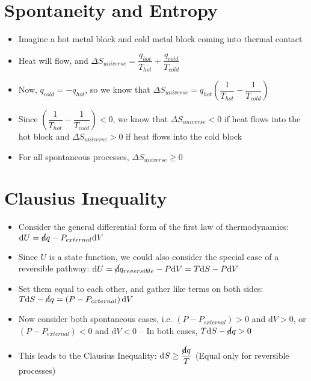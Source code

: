 \documentclass[12pt, openany, letterpaper]{memoir}
\begin{document}
\section*{Spontaneity and Entropy}
\begin{itemize}
	\item Imagine a hot metal block and cold metal block coming into thermal contact
	\item Heat will flow, and $\Delta S_{universe} = \dfrac{q_{hot}}{T_{hot}}  + \dfrac{q_{cold}}{T_{cold}}$
	\item Now, $q_{cold}=-q_{hot}$, so we know that $\Delta S_{universe} = q_{hot}\left(\dfrac{1}{T_{hot}}-\dfrac{1}{T_{cold}}\right)$
	\item Since $\left(\dfrac{1}{T_{hot}}-\dfrac{1}{T_{cold}}\right) < 0$, we know that $\Delta S_{universe} < 0$ if heat flows into the hot block and $\Delta S_{universe} > 0$ if heat flows into the cold block
	\item For all spontaneous processes, $\Delta S_{universe} \geq 0$
\end{itemize}
\section*{Clausius Inequality}
\begin{itemize}
	\item Consider the general differential form of the first law of thermodynamics: $\mathrm{d}U=\cancel{\mathrm{d}}q - P_{external}\mathrm{d}V$
	\item Since $U$ is a state function, we could also consider the special case of a reversible pathway: $\mathrm{d}U=\cancel{\mathrm{d}}q_{reversible} - P\mathrm{d}V = T\mathrm{d}S - P\mathrm{d}V$
	\item Set them equal to each other, and gather like terms on both sides: $T\mathrm{d}S - \cancel{\mathrm{d}}q = \left(P-P_{external}\right)\mathrm{d}V$
	\item Now consider both spontaneous cases, i.e. $\left(P-P_{external}\right)>0$ and $\mathrm{d}V>0$, or $\left(P-P_{external}\right)< 0$ and $\mathrm{d}V <0$ -- In both cases, $T\mathrm{d}S-\cancel{\mathrm{d}}q > 0$
	\item This leads to the Clausius Inequality: $\mathrm{d}S \geq \dfrac{\cancel{\mathrm{d}}q}{T}$ \hspace{1em} (Equal only for reversible processes)
\end{itemize}
\end{document}
